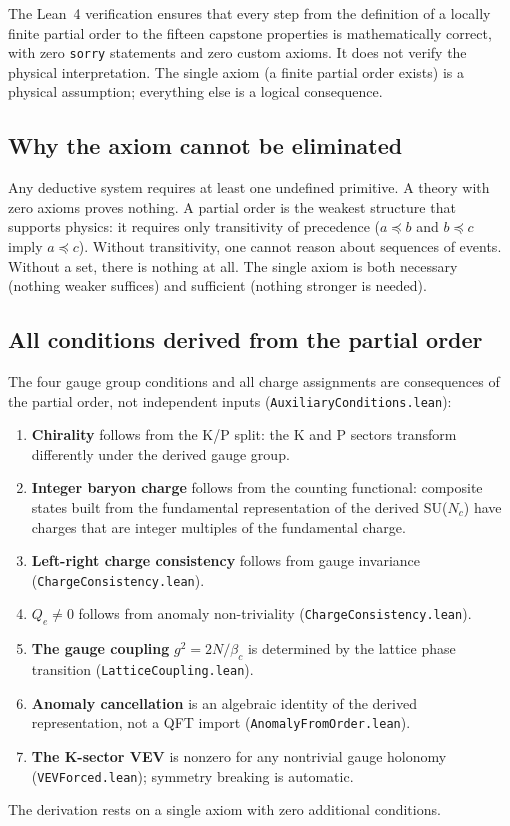 \documentclass[11pt,letterpaper]{article}
\begin{document}
The Lean~4 verification ensures that every step from the definition
of a locally finite partial order to the fifteen capstone properties
is mathematically correct, with zero \texttt{sorry} statements and
zero custom axioms.  It does not verify the physical interpretation.
The single axiom (a finite partial order exists) is a physical
assumption; everything else is a logical consequence.

\subsection{Why the axiom cannot be eliminated}

Any deductive system requires at least one undefined primitive.  A
theory with zero axioms proves nothing.  A partial order is the
weakest structure that supports physics: it requires only transitivity
of precedence ($a \preceq b$ and $b \preceq c$ imply $a \preceq c$).
Without transitivity, one cannot reason about sequences of events.
Without a set, there is nothing at all.  The single axiom is both
necessary (nothing weaker suffices) and sufficient (nothing stronger
is needed).

\subsection{All conditions derived from the partial order}

The four gauge group conditions and all charge assignments are
consequences of the partial order, not independent inputs
(\texttt{AuxiliaryConditions.lean}):
\begin{enumerate}[nosep]
  \item \textbf{Chirality} follows from the K/P split: the K and P
    sectors transform differently under the derived gauge group.
  \item \textbf{Integer baryon charge} follows from the counting
    functional: composite states built from the fundamental
    representation of the derived SU($N_c$) have charges that are
    integer multiples of the fundamental charge.
  \item \textbf{Left-right charge consistency} follows from gauge
    invariance (\texttt{Charge\-Consistency.lean}).
  \item \textbf{$Q_e \neq 0$} follows from anomaly non-triviality
    (\texttt{Charge\-Consistency.lean}).
  \item \textbf{The gauge coupling} $g^2 = 2N/\beta_c$ is determined
    by the lattice phase transition (\texttt{LatticeCoupling.lean}).
  \item \textbf{Anomaly cancellation} is an algebraic identity of
    the derived representation, not a QFT import
    (\texttt{AnomalyFromOrder.lean}).
  \item \textbf{The K-sector VEV} is nonzero for any nontrivial
    gauge holonomy (\texttt{VEVForced.lean}); symmetry breaking
    is automatic.
\end{enumerate}
The derivation rests on a single axiom with zero additional
conditions.
\end{document}

